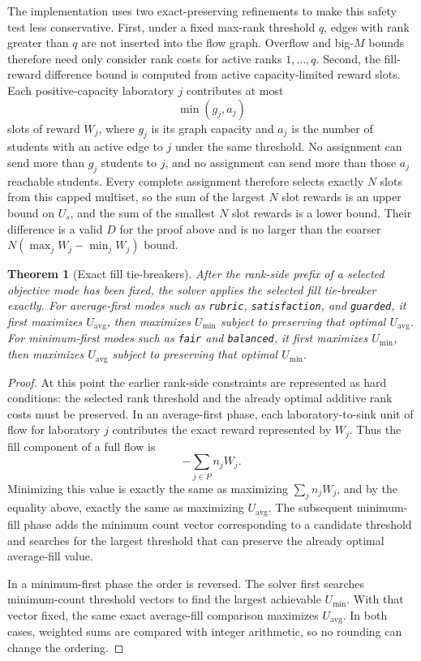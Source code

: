 \documentclass[11pt,a4paper]{article}
\newtheorem{theorem}{Theorem}
\begin{document}
The implementation uses two exact-preserving refinements to make this safety
test less conservative.  First, under a fixed max-rank threshold \(q\), edges
with rank greater than \(q\) are not inserted into the flow graph.  Overflow
and big-\(M\) bounds therefore need only consider rank costs for active ranks
\(1,\ldots,q\).  Second, the fill-reward difference bound is computed from
active capacity-limited reward slots.  Each positive-capacity laboratory
\(j\) contributes at most
\[
  \min(g_j,a_j)
\]
slots of reward \(W_j\), where \(g_j\) is its graph capacity and \(a_j\) is
the number of students with an active edge to \(j\) under the same threshold.
No assignment can send more than \(g_j\) students to \(j\), and no assignment
can send more than those \(a_j\) reachable students.  Every complete
assignment therefore selects exactly \(N\) slots from this capped multiset, so
the sum of the largest \(N\) slot rewards is an upper bound on \(U_s\), and
the sum of the smallest \(N\) slot rewards is a lower bound.  Their
difference is a valid \(D\) for the proof above and is no larger than the
coarser \(N(\max_j W_j-\min_j W_j)\) bound.

\begin{theorem}[Exact fill tie-breakers]
After the rank-side prefix of a selected objective mode has been fixed, the
solver applies the selected fill tie-breaker exactly.  For average-first modes
such as \texttt{rubric}, \texttt{satisfaction}, and \texttt{guarded}, it first
maximizes \(U_{\mathrm{avg}}\), then maximizes \(U_{\min}\) subject to
preserving that optimal \(U_{\mathrm{avg}}\).  For minimum-first modes such as
\texttt{fair} and \texttt{balanced}, it first maximizes \(U_{\min}\), then
maximizes \(U_{\mathrm{avg}}\) subject to preserving that optimal \(U_{\min}\).
\end{theorem}

\begin{proof}
At this point the earlier rank-side constraints are represented as hard
conditions: the selected rank threshold and the already optimal additive rank
costs must be preserved.  In an average-first phase, each laboratory-to-sink
unit of flow for laboratory \(j\) contributes the exact reward represented by
\(W_j\).  Thus the fill component of a full flow is
\[
  -\sum_{j\in P} n_j W_j.
\]
Minimizing this value is exactly the same as maximizing
\(\sum_j n_j W_j\), and by the equality above, exactly the same as maximizing
\(U_{\mathrm{avg}}\).  The subsequent minimum-fill phase adds the minimum
count vector corresponding to a candidate threshold and searches for the
largest threshold that can preserve the already optimal average-fill value.

In a minimum-first phase the order is reversed.  The solver first searches
minimum-count threshold vectors to find the largest achievable
\(U_{\min}\).  With that vector fixed, the same exact average-fill comparison
maximizes \(U_{\mathrm{avg}}\).  In both cases, weighted sums are compared
with integer arithmetic, so no rounding can change the ordering.
\end{proof}
\end{document}
